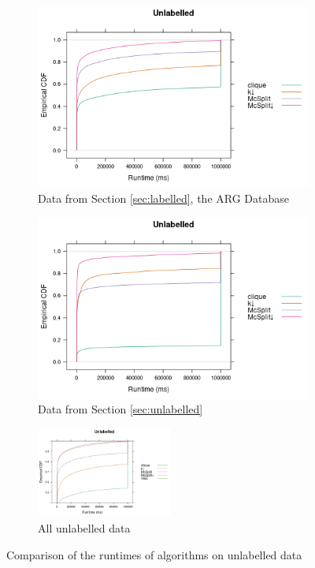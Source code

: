 \documentclass{l4proj}
\theoremstyle{definition}
\theoremstyle{remark}
\begin{document}
\begin{figure}
  \centering
  \begin{subfigure}[t]{0.49\textwidth}
    \centering
    \includegraphics[width=\textwidth]{images/ecdf_mcs.png}
    \caption{Data from Section \ref{sec:labelled}, the ARG Database}
    \label{fig:ecdf_unlabelled_mcs}
  \end{subfigure}
  \begin{subfigure}[t]{0.49\textwidth}
    \centering
    \includegraphics[width=\textwidth]{images/ecdf_sip.png}
    \caption{Data from Section \ref{sec:unlabelled}}
    \label{fig:ecdf_unlabelled_sip}
  \end{subfigure}
  \begin{subfigure}[t]{\textwidth}
    \centering
    \includegraphics[width=0.49\textwidth]{images/ecdf_unlabelled.png}
    \caption{All unlabelled data}
    \label{fig:ecdf_unlabelled_both}
  \end{subfigure}
  \caption{Comparison of the runtimes of algorithms on unlabelled data}
  \label{fig:ecdf_unlabelled}
\end{figure}
\end{document}
